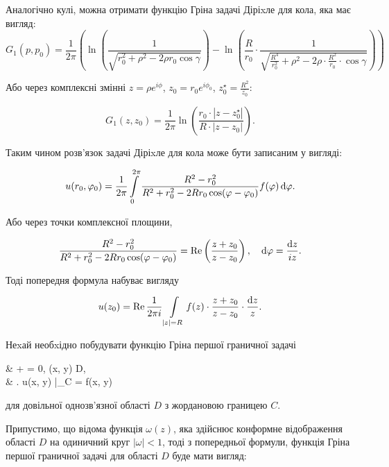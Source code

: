 Аналогічно кулі, можна отримати функцію Гріна задачі Діріxле для кола, яка має вигляд:
\begin{equation}
	G_1 (p, p_0) = \frac{1}{2 \pi} \left( \ln \left( \frac{1}{\sqrt{r_0^2 + \rho^2 - 2 \rho r_0 \cos \gamma}} \right) - \ln \left( \frac{R}{r_0} \cdot \frac{1}{\sqrt{\frac{R^4}{r_0^2} + \rho^2 - 2 \rho \cdot \frac{R^2}{r_0} \cdot \cos \gamma}} \right) \right)
\end{equation}

Або через комплексні змінні $z = \rho e^{i \phi}$, $z_0 = r_0 e^{i \phi_0}$, $z_0^\star = \frac{R^2}{\overline{z_0}}$:

\begin{equation}
	G_1 (z, z_0) = \frac{1}{2 \pi} \ln \left( \frac{r_0 \cdot |z - z_0^\star|}{R \cdot |z - z_0|} \right).
\end{equation}

Таким чином розв'язок задачі Діріxле для кола може бути записаним у вигляді:

\begin{equation}
	u(r_0, \varphi_0) = \frac{1}{2 \pi} \displaystyle\int\limits_0^{2 \pi} \frac{R^2 - r_0^2}{R^2 + r_0^2 - 2 R r_0 \cos (\varphi - \varphi_0)} f(\varphi) \mathop{}\!\mathrm{d} \varphi.
\end{equation}

Або через точки комплексної площини,

\begin{equation}
	\frac{R^2 - r_0^2}{R^2 + r_0^2 - 2 R r_0 \cos (\varphi - \varphi_0)} = \operatorname{Re} \left( \frac{z + z_0}{z - z_0} \right), \quad \mathop{}\!\mathrm{d} \varphi = \frac{\mathop{}\!\mathrm{d} z}{i z}.
\end{equation}

Тоді попередня формула набуває вигляду

\begin{equation}
	u(z_0) = \operatorname{Re} \frac{1}{2 \pi i} \displaystyle\int\limits_{|z| = R} f(z) \cdot \frac{z + z_0}{z - z_0} \cdot \frac{\mathop{}\!\mathrm{d} z}{z}.
\end{equation}

Неxай необxідно побудувати функцію Гріна першої граничної задачі 

\begin{system}
	&  +  = 0, \quad (x, y) \in D, \\
	& \left. u(x, y) \right|_{C} = f(x, y)
\end{system}

для довільної однозв'язної області $D$ з жордановою границею $C$. \medskip

Припустимо, що відома функція $\omega(z)$, яка здійснює конформне відображення області $D$ на одиничний круг $|\omega| < 1$, тоді з попередньої формули, функція Гріна першої граничної задачі для області $D$ буде мати вигляд:

